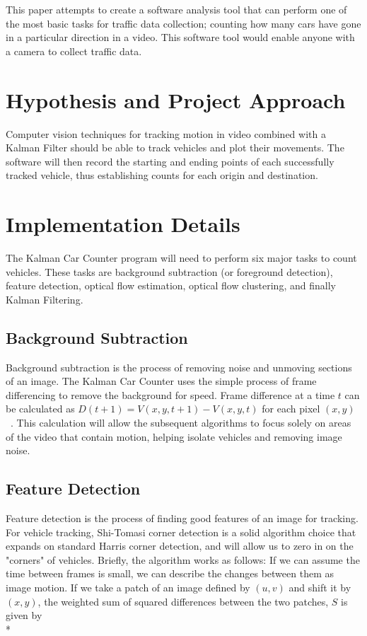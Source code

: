 \documentclass{article} %
\begin{document}
This paper attempts to create a software analysis tool that can perform one of the most basic tasks for traffic data collection; counting how many cars have gone in a particular direction in a video. This software tool would enable anyone with a camera to collect traffic data. 

\section{Hypothesis and Project Approach}
\label{sec:hypothesis}

Computer vision techniques for tracking motion in video combined with a Kalman Filter should be able to track vehicles and plot their movements. The software will then record the starting and ending points of each successfully tracked vehicle, thus establishing counts for each origin and destination. 

\section{Implementation Details}
\label{sec:implementation}

The Kalman Car Counter program will need to perform six major tasks to count vehicles. These tasks are background subtraction (or foreground detection), feature detection, optical flow estimation, optical flow clustering, and finally Kalman Filtering.

\subsection{Background Subtraction}
\label{subsec:back_subract}

Background subtraction is the process of removing noise and unmoving sections of an image.  The Kalman Car Counter uses the simple process of frame differencing to remove the background for speed. Frame difference at a time $t$ can be calculated as 
$ D(t+1) = V(x,y,t+1) - V(x,y,t) $ for each pixel $(x,y)$~\cite{Birgi09}.
This calculation will allow the subsequent algorithms to focus solely on areas of the video that contain motion, helping isolate vehicles and removing image noise.

\subsection{Feature Detection}
\label{subsec:feature_detec}

Feature detection is the process of finding good features of an image for tracking. For vehicle tracking, Shi-Tomasi corner detection is a solid algorithm choice that expands on standard Harris corner detection, and will allow us to zero in on the "corners" of vehicles. Briefly, the algorithm works as follows: If we can assume the time between frames is small, we can describe the changes between them as image motion. If we take a patch of an image defined by $(u,v)$ and shift it by $(x,y)$, the weighted sum of squared differences between the two patches, $S$ is given by \\*
\end{document}
